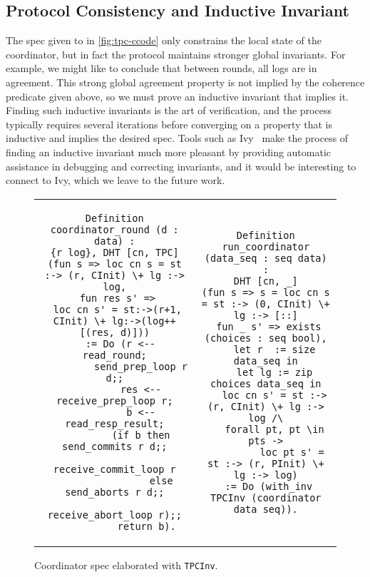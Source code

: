 \subsection{Protocol Consistency and Inductive Invariant}
\label{sec:cons-induct-invar}

The spec given to  in \cref{fig:tpc-ccode}
only constrains the local state  of the coordinator, but
in fact the protocol maintains stronger global invariants.
%
For example, we might like to conclude that between rounds, all logs
are in agreement.
%
This strong global agreement property is not implied by the coherence
predicate given above, so we must prove an inductive invariant that
implies it.
%
Finding such inductive invariants is the art of verification, and the
process typically requires several iterations before converging on a
property that is inductive and implies the desired spec.
%
Tools such as Ivy~\cite{Padon-al:PLDI16} make the process of finding
an inductive invariant much more pleasant by providing automatic
assistance in debugging and correcting invariants, and it would be
interesting to connect \disel to Ivy, which we leave to the future work.

{
\setlength{\belowcaptionskip}{-10pt}
\begin{figure}
\centering
\begin{tabular}{@{\!\!}c@{\ }c}
\begin{minipage}{0.5\linewidth}
\begin{lstlisting}[basicstyle=\scriptsize\ttfamily]
Definition coordinator_round (d : data) :
{r log}, DHT [cn, TPC]
(fun s => loc cn s = st :-> (r, CInit) \+ lg :-> log,
 fun res s' =>
 loc cn s' = st:->(r+1, CInit) \+ lg:->(log++[(res, d)]))
  := Do (r <-- read_round;
         send_prep_loop r d;;
         res <-- receive_prep_loop r;
         b <-- read_resp_result;
         (if b then send_commits r d;;
                     receive_commit_loop r
                else send_aborts r d;;
                     receive_abort_loop r);;
           return b).
\end{lstlisting}
\vspace{-10pt}
\caption{Spec and code of a coordinator round.}
\label{fig:tpc-ccode}
\end{minipage}
&
\setlength{\belowcaptionskip}{-10pt}
\begin{minipage}{0.5\linewidth}
\begin{lstlisting}[basicstyle=\scriptsize\ttfamily]
Definition run_coordinator (data_seq : seq data) :
DHT [cn, _]
(fun s => s = loc cn s = st :-> (0, CInit) \+ lg :-> [::]
 fun _ s' => exists (choices : seq bool),
   let r  := size data_seq in
   let lg := zip choices data_seq in
   loc cn s' = st :-> (r, CInit) \+ lg :-> log /\
   forall pt, pt \in pts ->
         loc pt s' = st :-> (r, PInit) \+ lg :-> log)
 := Do (with_inv TPCInv (coordinator data_seq)).
\end{lstlisting}
\vspace{25pt}
\caption{Coordinator spec elaborated with {\small\texttt{{TPCInv}}}.}
\label{fig:tpc-with-inv}
\end{minipage}
\end{tabular}
\end{figure}
}



